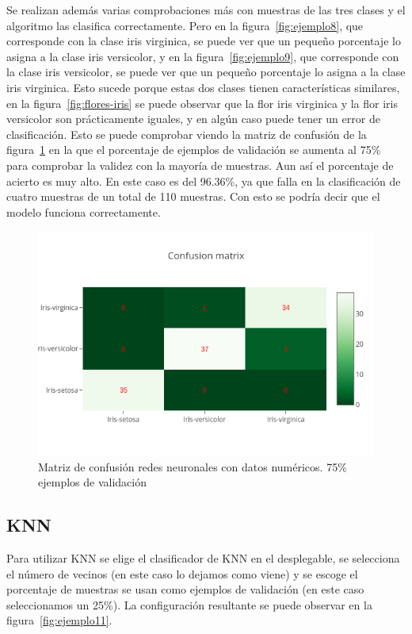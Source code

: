 \documentclass[a4paper, 12pt]{book}
\begin{document}
Se realizan además varias comprobaciones más con muestras de las tres clases y el algoritmo las clasifica correctamente. Pero en la figura~\ref{fig:ejemplo8}, que corresponde con la clase iris virginica, se puede ver que un pequeño porcentaje lo asigna a la clase iris versicolor, y en la figura~\ref{fig:ejemplo9}, que corresponde con la clase iris versicolor, se puede ver que un pequeño porcentaje lo asigna a la clase iris virginica. Esto sucede porque estas dos clases tienen características similares, en la figura~\ref{fig:flores-iris} se puede observar que la flor iris virginica y la flor iris versicolor son prácticamente iguales, y en algún caso puede tener un error de clasificación. Esto se puede comprobar viendo la matriz de confusión de la figura~\ref{fig:ejemplo10} en la que el porcentaje de ejemplos de validación se aumenta al 75\% para comprobar la validez con la mayoría de muestras. 
Aun así el porcentaje de acierto es muy alto. En este caso es del 96.36\%, ya que falla en la clasificación de cuatro muestras de un total de 110 muestras. Con esto se podría decir que el modelo funciona correctamente.
\begin{figure}
	\centering
	\includegraphics[width=12cm, keepaspectratio]{img/cm_num_rn2.png}
	\caption{Matriz de confusión redes neuronales con datos numéricos. 75\% ejemplos de validación} 	
	\label{fig:ejemplo10}
\end{figure}

\subsection{KNN}
\label{subsec:knn}

Para utilizar KNN se elige el clasificador de KNN en el desplegable, se selecciona el número de vecinos (en este caso lo dejamos como viene) y se escoge el porcentaje de muestras se usan como ejemplos de validación (en este caso seleccionamos un 25\%). La configuración resultante se puede observar en la figura~\ref{fig:ejemplo11}.
\end{document}
